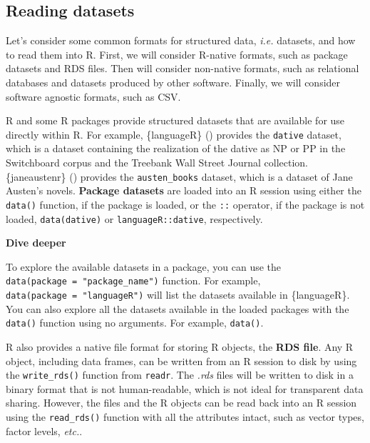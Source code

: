 \documentclass[
  letterpaper,
  krantz1]{latex/krantz-mod}
\theoremstyle{definition}
\theoremstyle{definition}
\theoremstyle{remark}
\begin{document}
\subsection{Reading datasets}\label{reading-datasets}

Let's consider some common formats for structured data, \emph{i.e.}
datasets, and how to read them into R. First, we will consider R-native
formats, such as package datasets and RDS files. Then will consider
non-native formats, such as relational databases and datasets produced
by other software. Finally, we will consider software agnostic formats,
such as CSV.

R and some R packages provide structured datasets that are available for
use directly within R. For example, \{languageR\}
() provides
the \texttt{dative} dataset, which is a dataset containing the
realization of the dative as NP or PP in the Switchboard corpus and the
Treebank Wall Street Journal collection. \{janeaustenr\}
() provides the
\texttt{austen\_books} dataset, which is a dataset of Jane Austen's
novels. \textbf{Package datasets} are loaded into an R session using
either the \texttt{data()} function, if the package is loaded, or the
\texttt{::} operator, if the package is not loaded,
\texttt{data(dative)} or \texttt{languageR::dative}, respectively.

\begin{tcolorbox}[enhanced jigsaw, leftrule=.75mm, colframe=quarto-callout-color-frame, left=2mm, colback=white, toprule=.15mm, breakable, arc=.35mm, opacityback=0, bottomrule=.15mm, rightrule=.15mm]

\textbf{ Dive deeper}

To explore the available datasets in a package, you can use the
\texttt{data(package\ =\ "package\_name")} function. For example,
\texttt{data(package\ =\ "languageR")} will list the datasets available
in \{languageR\}. You can also explore all the datasets available in the
loaded packages with the \texttt{data()} function using no arguments.
For example, \texttt{data()}.

\end{tcolorbox}

R also provides a native file format for storing R objects, the
\textbf{RDS file}. Any R object, including data frames, can be written
from an R session to disk by using the \texttt{write\_rds()} function
from \texttt{readr}. The \emph{.rds} files will be written to disk in a
binary format that is not human-readable, which is not ideal for
transparent data sharing. However, the files and the R objects can be
read back into an R session using the \texttt{read\_rds()} function with
all the attributes intact, such as vector types, factor levels,
\emph{etc.}.
\end{document}
